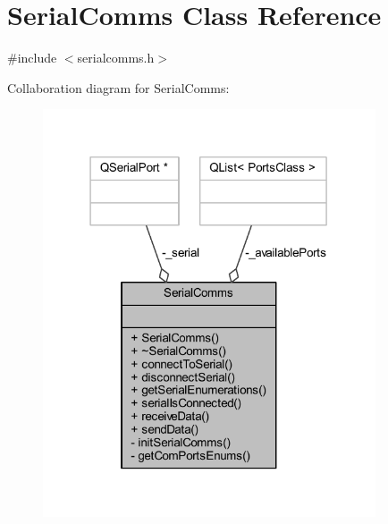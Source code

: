 \hypertarget{class_serial_comms}{}\section{Serial\+Comms Class Reference}
\label{class_serial_comms}


{\ttfamily \#include $<$serialcomms.\+h$>$}



Collaboration diagram for Serial\+Comms\+:
\nopagebreak
\begin{figure}[H]
\begin{center}
\leavevmode
\includegraphics[width=279pt]{class_serial_comms__coll__graph}
\end{center}
\end{figure}

